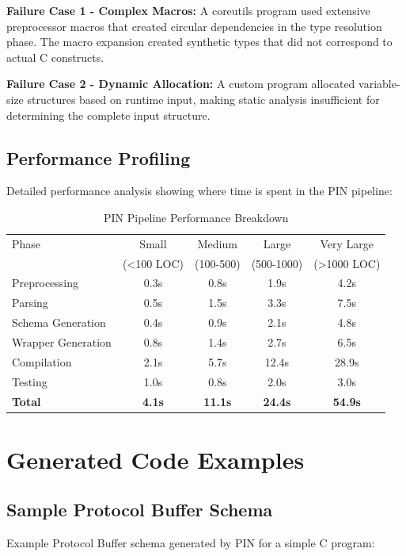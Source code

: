 \documentclass[doublespace,nopageskip]{VTthesis} %
\begin{document}
\begin{appendices}
			\textbf{Failure Case 1 - Complex Macros:}
			A coreutils program used extensive preprocessor macros that created circular dependencies in the type resolution phase. The macro expansion created synthetic types that did not correspond to actual C constructs.
			
			\textbf{Failure Case 2 - Dynamic Allocation:}
			A custom program allocated variable-size structures based on runtime input, making static analysis insufficient for determining the complete input structure.
			
			\section{Performance Profiling} \label{ase:performance_profiling}
			Detailed performance analysis showing where time is spent in the PIN pipeline:
			
			\begin{table}[htb]
				\centering
				\caption{PIN Pipeline Performance Breakdown}
				\begin{tabular}{lcccc}
					\toprule
					Phase & Small & Medium & Large & Very Large \\
					& (<100 LOC) & (100-500) & (500-1000) & (>1000 LOC) \\
					\midrule
					Preprocessing & 0.3s & 0.8s & 1.9s & 4.2s \\
					Parsing & 0.5s & 1.5s & 3.3s & 7.5s \\
					Schema Generation & 0.4s & 0.9s & 2.1s & 4.8s \\
					Wrapper Generation & 0.8s & 1.4s & 2.7s & 6.5s \\
					Compilation & 2.1s & 5.7s & 12.4s & 28.9s \\
					Testing & 1.0s & 0.8s & 2.0s & 3.0s \\
					\midrule
					\textbf{Total} & \textbf{4.1s} & \textbf{11.1s} & \textbf{24.4s} & \textbf{54.9s} \\
					\bottomrule
				\end{tabular}
				\label{tab:performance_breakdown}
			\end{table}
			
		\chapter{Generated Code Examples} \label{app:code_examples}
			\section{Sample Protocol Buffer Schema} \label{ase:sample_schema}
			Example Protocol Buffer schema generated by PIN for a simple C program:
			

\end{appendices}
\end{document}
